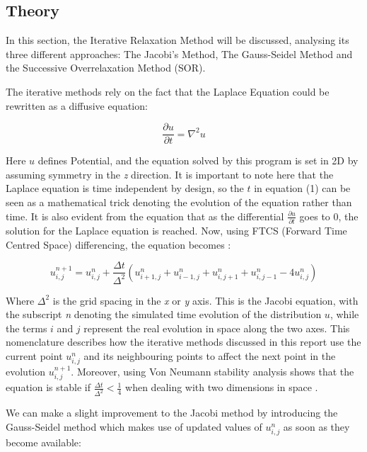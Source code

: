 \documentclass[a4paper]{article}
\begin{document}
\subsection{Theory}
\label{theory}

In this section, the Iterative Relaxation Method will be discussed, analysing its three different approaches: The Jacobi's Method, The Gauss-Seidel Method and the Successive Overrelaxation Method (SOR). 

The iterative methods rely on the fact that the Laplace Equation could be rewritten as a diffusive equation: \cite{NR}

\begin{equation}
\frac{\partial u}{\partial t}=\nabla^2u
\label{eq:Diffusion}
\end{equation}

Here $u$ defines Potential, and the equation solved by this program is set in 2D by assuming symmetry in the \textit{z} direction. It is important to note here that the Laplace equation is time independent by design, so the $t$ in equation (1) can be seen as a mathematical trick denoting the evolution of the equation rather than time. It is also evident from the equation that as the differential $\frac{ \partial u}{\partial t}$ goes to 0, the solution for the Laplace equation is reached. Now, using FTCS (Forward Time Centred Space) differencing, the equation becomes \cite{NR}:

\begin{equation}
u^{n+1}_{i,j}=u^n_{i,j}+\frac{\Delta t}{\Delta^2}(u^n_{i+1,j}+u^n_{i-1,j}+u^n_{i,j+1}+u^n_{i,j-1}-4u^n_{i,j})
\label{eq:FTCS}
\end{equation}

Where $\Delta ^2$ is the grid spacing in the \textit{x} or \textit{y} axis. This is the Jacobi equation, with the subscript \textit{n} denoting the simulated time evolution of the distribution $u$, while the terms $i$ and $j$ represent the real evolution in space along the two axes. This nomenclature describes how the iterative methods discussed in this report use the current point $u^{n}_{i,j}$ and its neighbouring points to affect the next point in the evolution $u^{n+1}_{i,j}$. Moreover, using Von Neumann stability analysis shows that the equation is stable if $\frac{\Delta t}{\Delta^2}<\frac{1}{4}$ when dealing with two dimensions in space \cite{matrixcomp} \cite{NR}.

We can make a slight improvement to the Jacobi method by introducing the Gauss-Seidel method which makes use of updated values of $u^n_{i,j}$ as soon as they become available:
\end{document}
